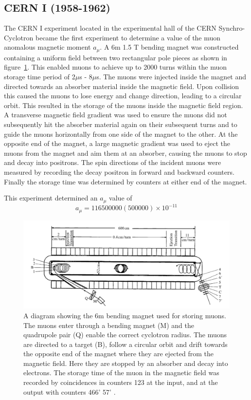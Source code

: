 \subsection{CERN I (1958-1962)}
The CERN I experiment located in the experimental hall of the CERN Synchro-Cyclotron became the first experiment to determine a value of the muon anomalous magnetic moment $a_{\mu}$. A 6m 1.5 T bending magnet was constructed containing a uniform field between two rectangular pole pieces as shown in figure~\ref{fig:cern1}. This enabled muons to achieve up to 2000 turns within the muon storage time period of 2$\mu$s - 8$\mu$s. The muons were injected inside the magnet and directed towards an absorber material inside the magnetic field. Upon collision this caused the muons to lose energy and change direction, leading to a circular orbit. This resulted in the storage of the muons inside the magnetic field region. A transverse magnetic field gradient was used to ensure the muons did not subsequently hit the absorber material again on their subsequent turns and to guide the muons horizontally from one side of the magnet to the other.
At the opposite end of the magnet, a large magnetic gradient was used to eject the muons from the magnet and aim them at an absorber, causing the muons to stop and decay into positrons. The spin directions of the incident muons were measured by recording the decay positron in forward and backward counters. Finally the storage time was determined by counters at either end of the magnet\cite{Reference10}. 

This experiment determined an $a_{\mu}$ value of \cite{Reference11} \cite{Reference12}
\begin{equation}
a_{\mu} = 116500000(500000){\times}10^{-11}
\end{equation}

\begin{figure}[th]
\centering
\includegraphics[scale=0.6]{Figures/cern1}
\decoRule
\caption{A diagram showing the 6m bending magnet used for storing muons. The muons enter through a bending magnet (M) and the quadrupole pair (Q) enable the correct cyclotron radius. The muons are directed to a target (B), follow a circular orbit and drift towards the opposite end of the magnet where they are ejected from the magnetic field. Here they are stopped by an absorber and decay into electrons. The storage time of the muon in the magnetic field was recorded by coincidences in counters 123 at the input, and at the output with counters 466' 57' \cite{Reference10}.}
\label{fig:cern1}
\end{figure}

